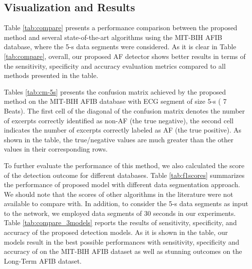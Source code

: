 \documentclass[conference]{IEEEtran}
\begin{document}
\begin{table} [ht]  

\caption{Confusion matrix achieved by the proposed method on the MIT-BIH AFIB database with ECG segment of size 5-s (
 7 Beats).}
\renewcommand{\arraystretch}{1.2}
\end{table}

\subsection{Visualization and Results}
\label{sec:visual_results}
 Table \ref{tab:compare} presents a performance comparison between the proposed method and several state-of-the-art algorithms using the MIT-BIH AFIB database, where the 5-s data segments were considered. As it is clear in Table \ref{tab:compare}, overall, our proposed AF detector shows better results in terms of the sensitivity, specificity and accuracy evaluation metrics compared to all methods presented in the table.
 
 Tables \ref{tab:cm-5s} presents the confusion matrix achieved by the proposed method on the MIT-BIH AFIB database with ECG segment of size 5-s ( 7 Beats). The first cell of the diagonal of the confusion matrix denotes the number of excerpts correctly identified as non-AF (the true negative), the second cell indicates the number of excerpts correctly labeled as AF (the true positive). As shown in the table, the true/negative values are much greater than the other values in their corresponding rows.
 
 
 To further evaluate the performance of this method, we also calculated the  score of the detection outcome for different databases. Table \ref{tab:f1scores} summarizes the performance of proposed model with different data segmentation approach. We should note that the  scores of other algorithms in the literature were not available to compare with. In addition, to consider the 5-s data segments as input to the network, we employed data segments of 30 seconds in our experiments. Table \ref{tab:compare_3models} reports the results of sensitivity, specificity, and accuracy of the proposed detection models. As it is shown in the table, our models result in the best possible performances with sensitivity, specificity and accuracy of  on the MIT-BIH AFIB dataset as well as stunning outcomes on the Long-Term AFIB dataset.     
\end{document}
